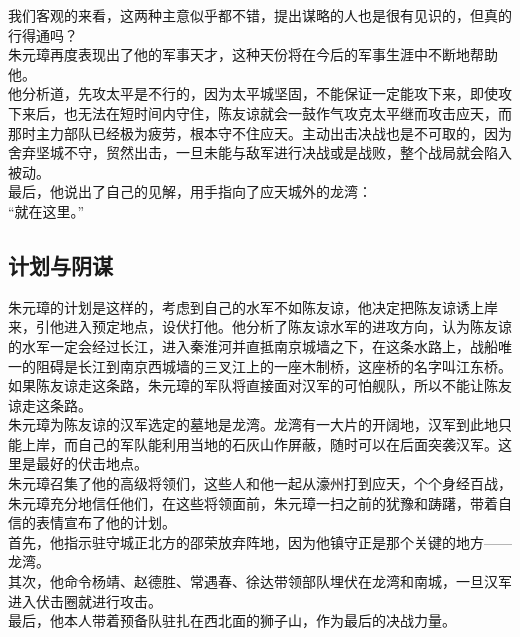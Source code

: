 \begin{multicols}{\theparacolNo}
我们客观的来看，这两种主意似乎都不错，提出谋略的人也是很有见识的，但真的行得通吗？\\

朱元璋再度表现出了他的军事天才，这种天份将在今后的军事生涯中不断地帮助他。\\

他分析道，先攻太平是不行的，因为太平城坚固，不能保证一定能攻下来，即使攻下来后，也无法在短时间内守住，陈友谅就会一鼓作气攻克太平继而攻击应天，而那时主力部队已经极为疲劳，根本守不住应天。主动出击决战也是不可取的，因为舍弃坚城不守，贸然出击，一旦未能与敌军进行决战或是战败，整个战局就会陷入被动。\\

最后，他说出了自己的见解，用手指向了应天城外的龙湾：\\

“就在这里。”\\

\subsection{计划与阴谋}
朱元璋的计划是这样的，考虑到自己的水军不如陈友谅，他决定把陈友谅诱上岸来，引他进入预定地点，设伏打他。他分析了陈友谅水军的进攻方向，认为陈友谅的水军一定会经过长江，进入秦淮河并直抵南京城墙之下，在这条水路上，战船唯一的阻碍是长江到南京西城墙的三叉江上的一座木制桥，这座桥的名字叫江东桥。\\

如果陈友谅走这条路，朱元璋的军队将直接面对汉军的可怕舰队，所以不能让陈友谅走这条路。\\

朱元璋为陈友谅的汉军选定的墓地是龙湾。龙湾有一大片的开阔地，汉军到此地只能上岸，而自己的军队能利用当地的石灰山作屏蔽，随时可以在后面突袭汉军。这里是最好的伏击地点。\\

朱元璋召集了他的高级将领们，这些人和他一起从濠州打到应天，个个身经百战，朱元璋充分地信任他们，在这些将领面前，朱元璋一扫之前的犹豫和踌躇，带着自信的表情宣布了他的计划。\\

首先，他指示驻守城正北方的邵荣放弃阵地，因为他镇守正是那个关键的地方——龙湾。\\

其次，他命令杨靖、赵德胜、常遇春、徐达带领部队埋伏在龙湾和南城，一旦汉军进入伏击圈就进行攻击。\\

最后，他本人带着预备队驻扎在西北面的狮子山，作为最后的决战力量。\\


\end{multicols}
